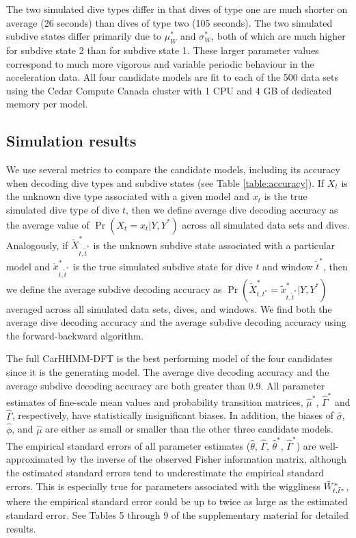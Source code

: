 The two simulated dive types differ in that dives of type one are much shorter on average (26 seconds) than dives of type two (105 seconds). The two simulated subdive states differ primarily due to $\mu_W^*$ and $\sigma_W^*$, both of which are much higher for subdive state 2 than for subdive state 1. These larger parameter values correspond to much more vigorous and variable periodic behaviour in the acceleration data. All four candidate models are fit to each of the 500 data sets using the Cedar Compute Canada cluster with 1 CPU and 4 GB of dedicated memory per model.

\subsection{Simulation results}

We use several metrics to compare the candidate models, including its accuracy when decoding dive types and subdive states (see Table \ref{table:accuracy}). If $X_t$ is the unknown dive type associated with a given model and $x_t$ is the true simulated dive type of dive $t$, then we define average dive decoding accuracy as the average value of $\Pr(X_{t} = x_{t}|Y,Y^*)$ across all simulated data sets and dives. Analogously, if $\tilde X^*_{t,\tilde t^*}$ is the unknown subdive state associated with a particular model and $\tilde x^*_{t,\tilde t^*}$ is the true simulated subdive state for dive $t$ and window $\tilde t^*$, then we define the average subdive decoding accuracy as $\Pr(\tilde X^*_{t,t^*} = \tilde x^*_{t,\tilde t^*}|Y,Y^*)$ averaged across all simulated data sets, dives, and windows. We find both the average dive decoding accuracy and the average subdive decoding accuracy using the forward-backward algorithm.

The full CarHHMM-DFT is the best performing model of the four candidates since it is the generating model. The average dive decoding accuracy and the average subdive decoding accuracy are both greater than 0.9. All parameter estimates of fine-scale mean values and probability transition matrices, $\hat \mu^*$, $\hat \Gamma^*$ and $\hat \Gamma$, respectively, have statistically insignificant biases. In addition, the biases of $\hat \sigma$, $\hat \phi$, and $\hat \mu$ are either as small or smaller than the other three candidate models. The empirical standard errors of all parameter estimates ($\hat \theta$, $\hat \Gamma$, $\hat \theta^*$, $\hat \Gamma^*$) are well-approximated by the inverse of the observed Fisher information matrix, although the estimated standard errors tend to underestimate the empirical standard errors. This is especially true for parameters associated with the wiggliness $\tilde{W}^*_{t,\tilde t^*}$, where the empirical standard error could be up to twice as large as the estimated standard error. See Tables 5 through 9 of the supplementary material for detailed results.

